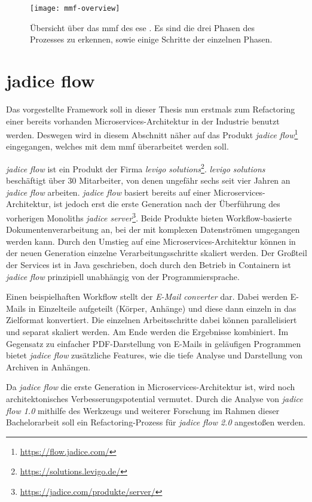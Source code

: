 \begin{figure}
	\centering
	\texttt{[image: mmf-overview]}
	\caption[\acrfull{mmf} Übersicht]{
		Übersicht über das \gls{mmf} des \gls{ese} \cite{fritzsch2022architecturecentric}. Es sind die drei Phasen des Prozesses zu erkennen, sowie einige Schritte der einzelnen Phasen.
	}
	\label{fig:mmf-overview}
\end{figure}

\section{jadice flow}

Das vorgestellte Framework soll in dieser Thesis nun erstmals zum Refactoring einer bereits vorhanden Microservices-Architektur in der Industrie benutzt werden.
Deswegen wird in diesem Abschnitt näher auf das Produkt \emph{jadice flow}\footnote{\url{https://flow.jadice.com/}} eingegangen, welches mit dem \gls{mmf} überarbeitet werden soll.

\emph{jadice flow} ist ein Produkt der Firma \emph{levigo solutions}\footnote{\url{https://solutions.levigo.de/}}.
\emph{levigo solutions} beschäftigt über 30 Mitarbeiter, von denen ungefähr sechs seit vier Jahren an \emph{jadice flow} arbeiten.
\emph{jadice flow} basiert bereits auf einer Microservices-Architektur, ist jedoch erst die erste Generation nach der Überführung des vorherigen Monoliths \emph{jadice server}\footnote{\url{https://jadice.com/produkte/server/}}.
Beide Produkte bieten Workflow-basierte Dokumentenverarbeitung an, bei der mit komplexen Datenströmen umgegangen werden kann.
Durch den Umstieg auf eine Microservices-Architektur können in der neuen Generation einzelne Verarbeitungsschritte skaliert werden.
Der Großteil der Services ist in Java geschrieben, doch durch den Betrieb in Containern ist \emph{jadice flow} prinzipiell unabhängig von der Programmiersprache.

Einen beispielhaften Workflow stellt der \emph{E-Mail converter} dar.
Dabei werden E-Mails in Einzelteile aufgeteilt (Körper, Anhänge) und diese dann einzeln in das Zielformat konvertiert.
Die einzelnen Arbeitsschritte dabei können parallelisiert und separat skaliert werden.
Am Ende werden die Ergebnisse kombiniert.
Im Gegensatz zu einfacher PDF-Darstellung von E-Mails in geläufigen Programmen bietet \emph{jadice flow} zusätzliche Features, wie die tiefe Analyse und Darstellung von Archiven in Anhängen.

Da \emph{jadice flow} die erste Generation in Microservices-Architektur ist, wird noch architektonisches Verbesserungspotential vermutet.
Durch die Analyse von \emph{jadice flow 1.0} mithilfe des Werkzeugs und weiterer Forschung im Rahmen dieser Bachelorarbeit soll ein Refactoring-Prozess für \emph{jadice flow 2.0} angestoßen werden.

